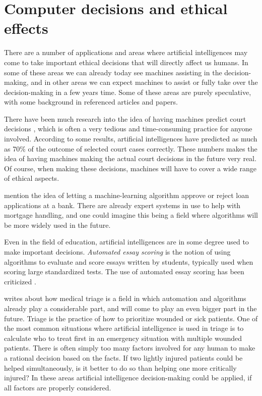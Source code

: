 \documentclass[11pt]{article}
\begin{document}
\section{Computer decisions and ethical effects}
There are a number of applications and areas where artificial intelligences may come to take important ethical decisions that will directly affect us humans. In some of these areas we can already today see machines assisting in the decision-making, and in other areas we can expect machines to assist or fully take over the decision-making in a few years time. Some of these areas are purely speculative, with some background in referenced articles and papers.

There have been much research into the idea of having machines predict court decisions 
\cite{martin2004competing}, which is often a very tedious and time-consuming practice for anyone involved.
According to some results, artificial intelligences have predicted as much as 70\% of the outcome of selected court cases correctly. These numbers makes the idea of having machines making the actual court decisions in the future very real. Of course, when making these decisions, machines will have to cover a wide range of ethical aspects.

\citeauthor{bostrom2013ethics} mention the idea of letting a machine-learning algorithm approve or reject loan applications at a bank. There are already expert systems in use to help with mortgage handling, and one could imagine this being a field where algorithms will be more widely used in the future.

Even in the field of education, artificial intelligences are in some degree used to make important decisions. \textit{Automated essay scoring} is the notion of using algorithms to evaluate and score essays written by students, typically used when scoring large standardized tests. The use of automated essay scoring has been criticized \cite{HumanReaders}.

 writes about how medical triage is a field in which automation and algorithms already play a considerable part, and will come to play an even bigger part in the future. Triage is the practice of how to prioritize wounded or sick patients. One of the most common situations where artificial intelligence is used in triage is to calculate who to treat first in an emergency situation with multiple wounded patients. There is often simply too many factors involved for any human to make a rational decision based on the facts. If two lightly injured patients could be helped simultaneously, is it better to do so than helping one more critically injured? In these areas artificial intelligence decision-making could be applied, if all factors are properly considered.
\end{document}
